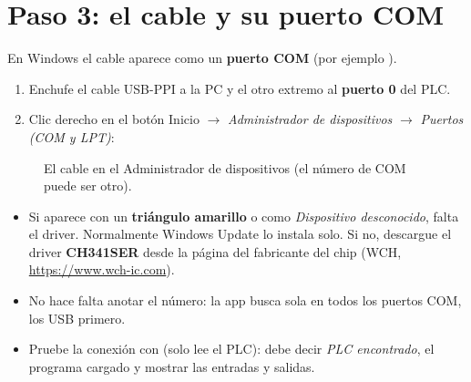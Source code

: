 \documentclass[a4paper,11pt]{article}
\begin{document}
\section{Paso 3: el cable y su puerto COM}
En Windows el cable aparece como un \textbf{puerto COM} (por ejemplo ).
\begin{enumerate}
\item Enchufe el cable USB-PPI a la PC y el otro extremo al \textbf{puerto 0} del PLC.
\item Clic derecho en el botón Inicio $\rightarrow$ \emph{Administrador de dispositivos} $\rightarrow$ \emph{Puertos (COM y LPT)}:
\end{enumerate}
\begin{figure}[H]
\centering
{}
\caption{El cable en el Administrador de dispositivos (el número de COM puede ser otro).}
\end{figure}
\begin{itemize}
\item Si aparece con un \textbf{triángulo amarillo} o como \emph{Dispositivo desconocido}, falta el driver. Normalmente Windows Update lo instala solo. Si no, descargue el driver \textbf{CH341SER} desde la página del fabricante del chip (WCH, \url{https://www.wch-ic.com}).
\item No hace falta anotar el número: la app busca sola en todos los puertos COM, los USB primero.
\item Pruebe la conexión con  (solo lee el PLC): debe decir \emph{PLC encontrado}, el programa cargado y mostrar las entradas y salidas.
\end{itemize}

\end{document}
